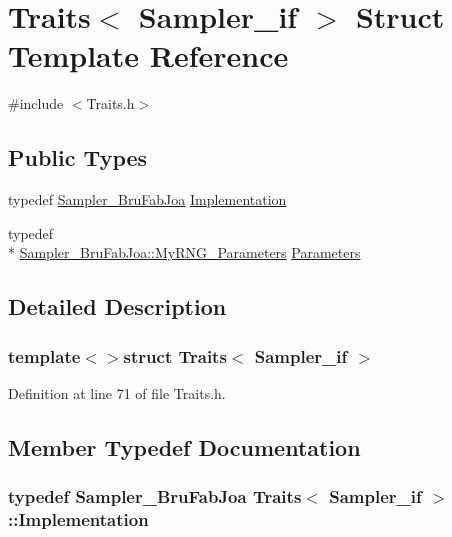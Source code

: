 \hypertarget{struct_traits_3_01_sampler__if_01_4}{\section{Traits$<$ Sampler\-\_\-if $>$ Struct Template Reference}
\label{struct_traits_3_01_sampler__if_01_4}
}


{\ttfamily \#include $<$Traits.\-h$>$}

\subsection*{Public Types}
\begin{DoxyCompactItemize}
\item 
typedef \hyperlink{class_sampler___bru_fab_joa}{Sampler\-\_\-\-Bru\-Fab\-Joa} \hyperlink{struct_traits_3_01_sampler__if_01_4_ac671b4707ba7d48439b364bdc9341a2e}{Implementation}
\item 
typedef \\*
\hyperlink{struct_sampler___bru_fab_joa_1_1_my_r_n_g___parameters}{Sampler\-\_\-\-Bru\-Fab\-Joa\-::\-My\-R\-N\-G\-\_\-\-Parameters} \hyperlink{struct_traits_3_01_sampler__if_01_4_a3e3228ca7fdd226d0a78be29ba406660}{Parameters}
\end{DoxyCompactItemize}


\subsection{Detailed Description}
\subsubsection*{template$<$$>$struct Traits$<$ Sampler\-\_\-if $>$}



Definition at line 71 of file Traits.\-h.



\subsection{Member Typedef Documentation}
\hypertarget{struct_traits_3_01_sampler__if_01_4_ac671b4707ba7d48439b364bdc9341a2e}{
\subsubsection[{Implementation}]{\setlength{\rightskip}{0pt plus 5cm}typedef {\bf Sampler\-\_\-\-Bru\-Fab\-Joa} {\bf Traits}$<$ {\bf Sampler\-\_\-if} $>$\-::{\bf Implementation}}}\label{struct_traits_3_01_sampler__if_01_4_ac671b4707ba7d48439b364bdc9341a2e}


